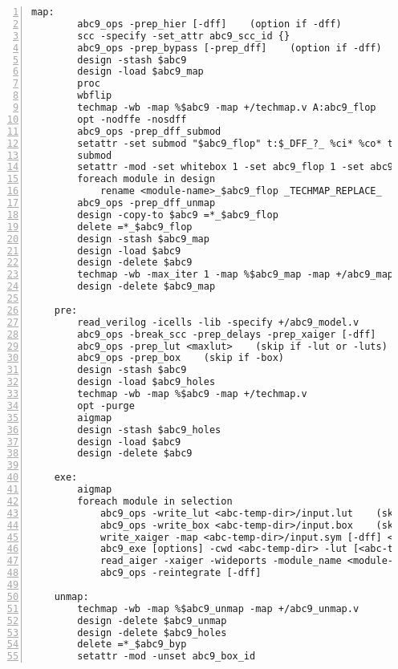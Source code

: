 \begin{lstlisting}[numbers=left,frame=single]
    map:
        abc9_ops -prep_hier [-dff]    (option if -dff)
        scc -specify -set_attr abc9_scc_id {}
        abc9_ops -prep_bypass [-prep_dff]    (option if -dff)
        design -stash $abc9
        design -load $abc9_map
        proc
        wbflip
        techmap -wb -map %$abc9 -map +/techmap.v A:abc9_flop
        opt -nodffe -nosdff
        abc9_ops -prep_dff_submod                                                     (only if -dff)
        setattr -set submod "$abc9_flop" t:$_DFF_?_ %ci* %co* t:$_DFF_?_ %d           (only if -dff)
        submod                                                                        (only if -dff)
        setattr -mod -set whitebox 1 -set abc9_flop 1 -set abc9_box 1 *_$abc9_flop    (only if -dff)
        foreach module in design
            rename <module-name>_$abc9_flop _TECHMAP_REPLACE_                         (only if -dff)
        abc9_ops -prep_dff_unmap                                                      (only if -dff)
        design -copy-to $abc9 =*_$abc9_flop                                           (only if -dff)
        delete =*_$abc9_flop                                                          (only if -dff)
        design -stash $abc9_map
        design -load $abc9
        design -delete $abc9
        techmap -wb -max_iter 1 -map %$abc9_map -map +/abc9_map.v [-D DFF]    (option if -dff)
        design -delete $abc9_map

    pre:
        read_verilog -icells -lib -specify +/abc9_model.v
        abc9_ops -break_scc -prep_delays -prep_xaiger [-dff]    (option for -dff)
        abc9_ops -prep_lut <maxlut>    (skip if -lut or -luts)
        abc9_ops -prep_box    (skip if -box)
        design -stash $abc9
        design -load $abc9_holes
        techmap -wb -map %$abc9 -map +/techmap.v
        opt -purge
        aigmap
        design -stash $abc9_holes
        design -load $abc9
        design -delete $abc9

    exe:
        aigmap
        foreach module in selection
            abc9_ops -write_lut <abc-temp-dir>/input.lut    (skip if '-lut' or '-luts')
            abc9_ops -write_box <abc-temp-dir>/input.box    (skip if '-box')
            write_xaiger -map <abc-temp-dir>/input.sym [-dff] <abc-temp-dir>/input.xaig
            abc9_exe [options] -cwd <abc-temp-dir> -lut [<abc-temp-dir>/input.lut] -box [<abc-temp-dir>/input.box]
            read_aiger -xaiger -wideports -module_name <module-name>$abc9 -map <abc-temp-dir>/input.sym <abc-temp-dir>/output.aig
            abc9_ops -reintegrate [-dff]

    unmap:
        techmap -wb -map %$abc9_unmap -map +/abc9_unmap.v
        design -delete $abc9_unmap
        design -delete $abc9_holes
        delete =*_$abc9_byp
        setattr -mod -unset abc9_box_id
\end{lstlisting}

